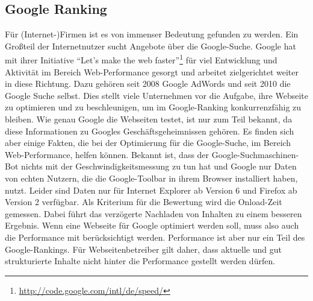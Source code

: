 \subsection{Google Ranking}
Für (Internet-)Firmen ist es von immenser Bedeutung gefunden zu werden. Ein Großteil der Internetnutzer sucht Angebote über die Google-Suche.
Google hat mit ihrer Initiative "`Let's make the web faster"'\footnote{\url{http://code.google.com/intl/de/speed/}} für viel Entwicklung und Aktivität im Bereich Web-Performance gesorgt und arbeitet zielgerichtet weiter in diese Richtung. Dazu gehören seit 2008 Google AdWords und seit 2010 die Google Suche selbst. Dies stellt viele Unternehmen vor die Aufgabe, ihre Webseite zu optimieren und zu beschleunigen, um im Google-Ranking konkurrenzfähig zu bleiben. Wie genau Google die Webseiten testet, ist nur zum Teil bekannt, da diese Informationen zu Googles Geschäftsgeheimnissen gehören. Es finden sich aber einige Fakten, die bei der Optimierung für die Google-Suche, im Bereich Web-Performance, helfen können.
Bekannt ist, dass der Google-Suchmaschinen-Bot nichts mit der Geschwindigkeitsmessung zu tun hat und Google nur Daten von echten Nutzern, die die Google-Toolbar in ihrem Browser installiert haben, nutzt. Leider sind Daten nur für Internet Explorer ab Version 6 und Firefox ab Version 2 verfügbar. Als Kriterium für die Bewertung wird die Onload-Zeit gemessen. Dabei führt das verzögerte Nachladen von Inhalten zu einem besseren Ergebnis. Wenn eine Webseite für Google optimiert werden soll, muss also auch die Performance mit berücksichtigt werden. Performance ist aber nur ein Teil des Google-Rankings. Für Webseitenbetreiber gilt daher, dass aktuelle und gut strukturierte Inhalte nicht hinter die Performance gestellt werden dürfen.

